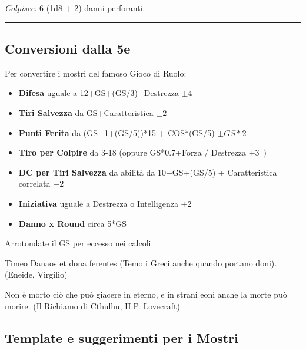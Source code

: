 \begin{multicols}{2}
{\emph{Colpisce:} 6 (1d8 + 2) danni perforanti.

}  %





\rule{\linewidth}{2pt}

\subsection{Conversioni dalla 5e}

Per convertire i mostri del famoso Gioco di Ruolo:

\begin{itemize}[leftmargin=*] \setlength{\itemsep}{0pt}
\item \textbf{Difesa} uguale a 12+GS+(GS/3)+Destrezza $\pm4$\
\item \textbf{Tiri Salvezza} da GS+Caratteristica $\pm2$\
\item \textbf{Punti Ferita} da (GS+1+(GS/5))*15 + COS*(GS/5) $\pm GS*2$\
\item \textbf{Tiro per Colpire} da 3-18 (oppure GS*0.7+Forza / Destrezza $\pm3$\ )
\item \textbf{DC per Tiri Salvezza} da abilità da 10+GS+(GS/5) + Caratteristica correlata  $\pm2$\
\item \textbf{Iniziativa} uguale a Destrezza o Intelligenza  $\pm2$\
\item \textbf{Danno x Round} circa 5*GS
\end{itemize}

Arrotondate il GS per eccesso nei calcoli.

\end{multicols}

\vfill

\begin{enfasi}

Timeo Danaos et dona ferentes (Temo i Greci anche quando portano doni). (Eneide, Virgilio)

\medskip

Non è morto ciò che può giacere in eterno, e in strani eoni anche la morte può morire. (Il Richiamo di Cthulhu, H.P. Lovecraft)

\end{enfasi}

\pagebreak

\subsection{Template e suggerimenti per i Mostri}


